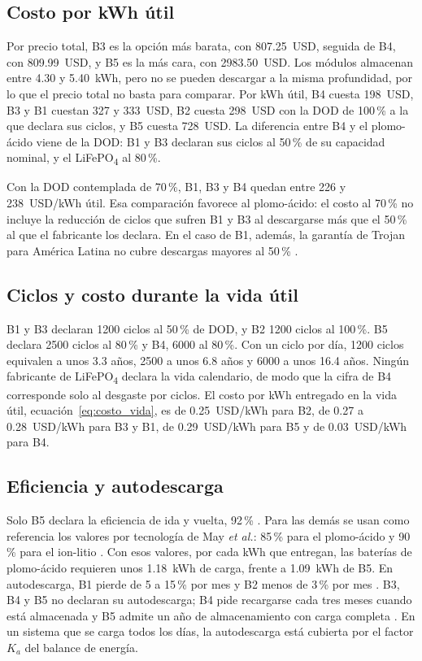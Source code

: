 \subsection{Costo por kWh útil}

Por precio total, B3 es la opción más barata, con \SI{807.25}{USD}, seguida de B4, con \SI{809.99}{USD}, y B5 es la más cara, con \SI{2983.50}{USD}. Los módulos almacenan entre 4.30 y \SI{5.40}{kWh}, pero no se pueden descargar a la misma profundidad, por lo que el precio total no basta para comparar. Por kWh útil, B4 cuesta \SI{198}{USD}, B3 y B1 cuestan 327 y \SI{333}{USD}, B2 cuesta \SI{298}{USD} con la DOD de 100\,\% a la que declara sus ciclos, y B5 cuesta \SI{728}{USD}. La diferencia entre B4 y el plomo-ácido viene de la DOD: B1 y B3 declaran sus ciclos al 50\,\% de su capacidad nominal, y el LiFePO\textsubscript{4} al 80\,\%.

Con la DOD contemplada de 70\,\%, B1, B3 y B4 quedan entre 226 y \SI{238}{USD/kWh} útil. Esa comparación favorece al plomo-ácido: el costo al 70\,\% no incluye la reducción de ciclos que sufren B1 y B3 al descargarse más que el 50\,\% al que el fabricante los declara. En el caso de B1, además, la garantía de Trojan para América Latina no cubre descargas mayores al 50\,\% \cite{trojan_latam}.

\subsection{Ciclos y costo durante la vida útil}

B1 y B3 declaran 1200 ciclos al 50\,\% de DOD, y B2 1200 ciclos al 100\,\%. B5 declara 2500 ciclos al 80\,\% y B4, 6000 al 80\,\%. Con un ciclo por día, 1200 ciclos equivalen a unos 3.3 años, 2500 a unos 6.8 años y 6000 a unos 16.4 años. Ningún fabricante de LiFePO\textsubscript{4} declara la vida calendario, de modo que la cifra de B4 corresponde solo al desgaste por ciclos. El costo por kWh entregado en la vida útil, ecuación~\eqref{eq:costo_vida}, es de \SI{0.25}{USD/kWh} para B2, de 0.27 a \SI{0.28}{USD/kWh} para B3 y B1, de \SI{0.29}{USD/kWh} para B5 y de \SI{0.03}{USD/kWh} para B4.

\subsection{Eficiencia y autodescarga}

Solo B5 declara la eficiencia de ida y vuelta, 92\,\% \cite{victron_ds}. Para las demás se usan como referencia los valores por tecnología de May \emph{et al.}: 85\,\% para el plomo-ácido y 90\,\% para el ion-litio \cite{may2018}. Con esos valores, por cada kWh que entregan, las baterías de plomo-ácido requieren unos \SI{1.18}{kWh} de carga, frente a \SI{1.09}{kWh} de B5. En autodescarga, B1 pierde de 5 a 15\,\% por mes \cite{trojan_t105} y B2 menos de 3\,\% por mes \cite{trojan_saes}. B3, B4 y B5 no declaran su autodescarga; B4 pide recargarse cada tres meses cuando está almacenada \cite{pq_manual} y B5 admite un año de almacenamiento con carga completa \cite{victron_ds}. En un sistema que se carga todos los días, la autodescarga está cubierta por el factor $K_a$ del balance de energía.

